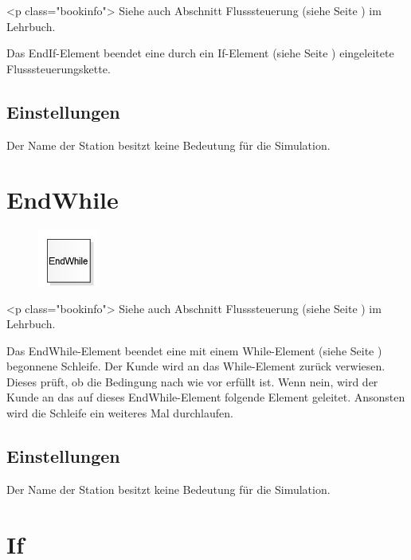 <p class="bookinfo">
Siehe auch Abschnitt Flusssteuerung (siehe Seite \pageref{ref:book:8.10}) im Lehrbuch.

Das EndIf-Element beendet eine durch ein
If-Element (siehe Seite \pageref{ref:ModelElementLogicEndIf}) eingeleitete
Flusssteuerungskette.

\subsection*{Einstellungen}

Der Name der Station besitzt keine Bedeutung für die Simulation.


\section{EndWhile}
\label{ref:ModelElementLogicEndWhile}

\begin{figure}
\vspace{-22pt}
\includegraphics[width=2cm]{imageModelElementLogicEndWhile.png}
\vspace{-22pt}
\end{figure}

<p class="bookinfo">
Siehe auch Abschnitt Flusssteuerung (siehe Seite \pageref{ref:book:8.10}) im Lehrbuch.

Das EndWhile-Element beendet eine mit einem
While-Element (siehe Seite \pageref{ref:ModelElementLogicWhile}) begonnene
Schleife. Der Kunde wird an das While-Element zurück verwiesen.
Dieses prüft, ob die Bedingung nach wie vor erfüllt ist.
Wenn nein, wird der Kunde an das auf dieses EndWhile-Element
folgende Element geleitet. Ansonsten wird die Schleife ein
weiteres Mal durchlaufen.

\subsection*{Einstellungen}

Der Name der Station besitzt keine Bedeutung für die Simulation.


\section{If}
\label{ref:ModelElementLogicIf}

